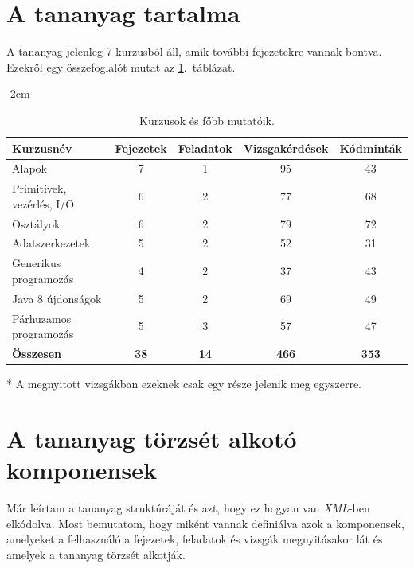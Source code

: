 \documentclass[12pt,a4paper]{article}
\newcommand{\xml}{\textit{XML}\xspace}
\begin{document}
	\section{A tananyag tartalma}
	
	A tananyag jelenleg 7 kurzusból áll, amik további fejezetekre vannak bontva. Ezekről egy összefoglalót mutat az \ref{kurzusok_tablazat}.\ táblázat.
	
	\bigskip
	\begin{table}[h!]
		\centering
		\addtolength{\leftskip} {-2cm} %
		\addtolength{\rightskip}{-2cm}
		\begin{threeparttable}	
			\begin{tabular}{|l|c|c|c|c|}
				\hline
				\textbf{Kurzusnév} & \textbf{Fejezetek} & \textbf{Feladatok} & \textbf{Vizsgakérdések}\tnote{*} & \textbf{Kódminták} \\
				\hline
				Alapok 						& 7 & 1 & 95 & 43 \\
				\hline
				Primitívek, vezérlés, I/O 	& 6 & 2 & 77 & 68 \\
				\hline
				Osztályok 					& 6 & 2 & 79 & 72  \\
				\hline
				Adatszerkezetek				& 5 & 2 & 52 & 31 \\
				\hline
				Generikus programozás		& 4 & 2 & 37 & 43 \\
				\hline
				Java 8 újdonságok 			& 5 & 2 & 69 & 49 \\
				\hline
				Párhuzamos programozás 		& 5 & 3 & 57 & 47 \\
				\hline
				\textbf{Összesen} 			& \textbf{38} & \textbf{14} & \textbf{466} & \textbf{353} \\
				\hline
			\end{tabular}
			\begin{tablenotes}
				\item[*] A megnyitott vizsgákban ezeknek csak egy része jelenik meg egyszerre.
			\end{tablenotes}
		\end{threeparttable}
		\caption{Kurzusok és főbb mutatóik.}
		\label{kurzusok_tablazat}
	\end{table}
	
	\section{A tananyag törzsét alkotó komponensek}\label{tananyag_torzse}

	Már leírtam a tananyag struktúráját és azt, hogy ez hogyan van \xml-ben elkódolva. Most bemutatom, hogy miként vannak definiálva azok a komponensek, amelyeket a felhasználó a fejezetek, feladatok és vizsgák megnyitásakor lát és amelyek a tananyag törzsét alkotják.
	
\end{document}
